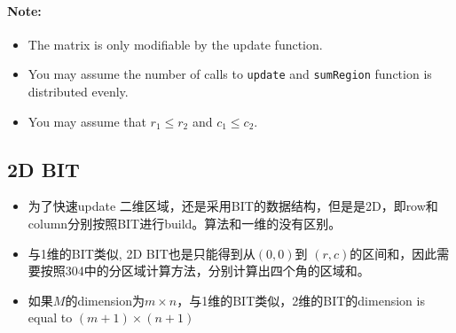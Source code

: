 \paragraph{Note:}
\begin{itemize}
\item The matrix is only modifiable by the update function.
\item You may assume the number of calls to \texttt{update} and \texttt{sumRegion} function is distributed evenly.
 \item You may assume that $r_1 \leq r_2$ and $c_1 \leq c_2$.
\end{itemize}
\subsection{2D BIT}
\begin{itemize}
\item 为了快速update 二维区域，还是采用BIT的数据结构，但是是2D，即row和column分别按照BIT进行build。算法和一维的没有区别。
\item 与1维的BIT类似, 2D BIT也是只能得到从$ (0,0) $到 $ (r,c) $的区间和，因此需要按照304中的分区域计算方法，分别计算出四个角的区域和。
\item 如果$M$的dimension为$m\times n$，与1维的BIT类似，2维的BIT的dimension is equal to $ (m+1)\times (n+1) $
\end{itemize}
\setcounter{lstlisting}{0}
